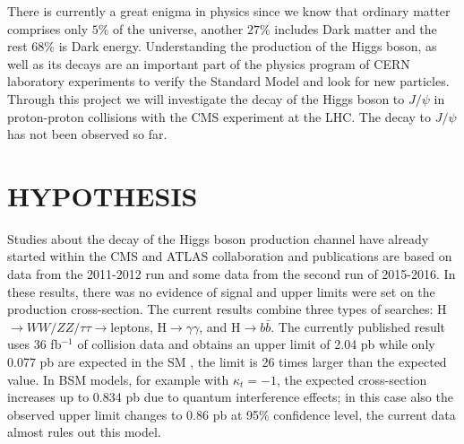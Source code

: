 \documentclass[final,3p]{CSP}
\begin{document}
\onehalfspacing There is currently a great enigma in physics since we know that ordinary matter comprises only $5\%$ of the universe, another $27\%$ includes Dark matter and the rest $68\%$ is Dark energy.
Understanding the production of the Higgs boson, as well as its decays are an important part of the physics program of CERN laboratory experiments to verify the Standard Model and look for new particles. Through this project we will investigate the decay of the Higgs boson to $J/\psi$ in proton-proton collisions with the CMS experiment at the LHC. The decay to $J/\psi$ has not been observed so far.

\section{HYPOTHESIS}

\onehalfspacing Studies about the decay of the Higgs boson production channel have already started within the CMS and ATLAS collaboration and publications are based on data from the 2011-2012 run and some data from the second run of 2015-2016.
In these results, there was no evidence of signal and upper limits were set on the production cross-section.
The current results combine three types of searches: H$\rightarrow WW/ZZ/\tau\tau \rightarrow$leptons, H$\rightarrow\gamma\gamma$, and H$\rightarrow b\bar{b}$.
The currently published result uses 36 fb$^{-1}$ of collision data and obtains an upper limit of 2.04 pb while only 0.077 pb are expected in the SM \cite{sirunyan2019search}, the limit is 26 times larger than the expected value.
In BSM models, for example with $\kappa_t = -1$,  the expected cross-section increases up to 0.834 pb due to quantum interference effects; in this case also the observed upper limit changes to 0.86 pb at 95$\%$ confidence level, the current data almost rules out this model.  
\end{document}
